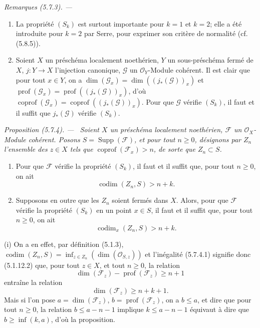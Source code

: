 \documentclass[10pt,oneside]{book}
\newenvironment{proposition}[1][]{%
  \par\medskip\noindent\itshape Proposition (#1). ---\ }{\par}
\newenvironment{remarks}[1][]{%
  \par\medskip\noindent\itshape Remarques (#1). ---\ }{\par}
\begin{document}
\begin{remarks}[5.7.3]
\begin{enumerate}
\item[(v)] La propriété $(S_k)$ est surtout importante pour $k=1$ et
$k=2$; elle a été introduite pour $k=2$ par Serre, pour exprimer son critère
de normalité (cf. (5.8.5)).

\item[(vi)] Soient $X$ un préschéma localement noethérien, $Y$ un
sous-préschéma fermé de $X$, $j:Y\to X$ l'injection canonique, $\mathscr G$
un $\mathcal O_Y$-Module cohérent. Il est clair que pour tout $x\in Y$, on a
$\dim(\mathscr G_x)=\dim((j_*(\mathscr G))_x)$ et
$\operatorname{prof}(\mathscr G_x)=\operatorname{prof}((j_*(\mathscr G))_x)$,
d'où
$\operatorname{coprof}(\mathscr G_x)=\operatorname{coprof}((j_*(\mathscr G))_x)$.
Pour que $\mathscr G$ vérifie $(S_k)$, il faut et il suffit que
$j_*(\mathscr G)$ vérifie $(S_k)$.
\end{enumerate}
\end{remarks}

\begin{proposition}[5.7.4]
\label{IV.2.s5.7.4-fr}
Soient $X$ un préschéma localement noethérien, $\mathscr F$ un
$\mathcal O_X$-Module cohérent. Posons $S=\operatorname{Supp}(\mathscr F)$,
et pour tout $n\geq0$, désignons par $Z_n$ l'ensemble des $z\in X$ tels que
$\operatorname{coprof}(\mathscr F_x)>n$, de sorte que $Z_n\subset S$.
\begin{enumerate}
\item[(i)] Pour que $\mathscr F$ vérifie la propriété $(S_k)$, il faut et il
suffit que, pour tout $n\geq0$, on ait
\begin{equation}
\operatorname{codim}(Z_n,S)>n+k.
\tag{5.7.4.1}\label{IV.2.s5.7.4.1-fr}
\end{equation}
\item[(ii)] Supposons en outre que les $Z_n$ soient fermés dans $X$. Alors,
pour que $\mathscr F$ vérifie la propriété $(S_k)$ en un point $x\in S$, il
faut et il suffit que, pour tout $n\geq0$, on ait
\begin{equation}
\operatorname{codim}_x(Z_n,S)>n+k.
\tag{5.7.4.2}\label{IV.2.s5.7.4.2-fr}
\end{equation}
\end{enumerate}
\end{proposition}

(i) On a en effet, par définition (5.1.3),
$\operatorname{codim}(Z_n,S)=\inf_{z\in Z_n}(\dim(\mathcal O_{S,z}))$ et
l'inégalité (5.7.4.1) signifie donc (5.1.12.2) que, pour tout $z\in X$, et
tout $n\geq0$, la relation
\[
\dim(\mathscr F_z)-\operatorname{prof}(\mathscr F_z)\geq n+1
\]
entraîne la relation
\[
\dim(\mathscr F_z)\geq n+k+1.
\]
Mais si l'on pose $a=\dim(\mathscr F_z)$,
$b=\operatorname{prof}(\mathscr F_z)$, on a $b\leq a$, et dire que pour tout
$n\geq0$, la relation $b\leq a-n-1$ implique $k\leq a-n-1$ équivaut à dire
que $b\geq\inf(k,a)$, d'où la proposition.
\end{document}
